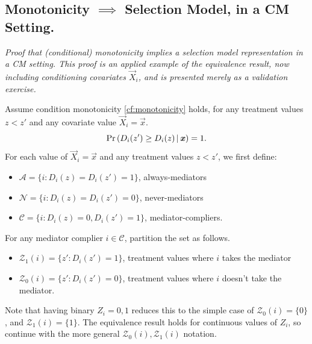 
\subsection{Monotonicity $\implies$ Selection Model, in a CM Setting.}
\label{appendix:cf-monotonicity}
\textit{Proof that (conditional) monotonicity implies a selection model representation in a CM setting.
    This proof is an applied example of the \cite{vytlacil2002independence} equivalence result, now including conditioning covariates $\vec X_i$, and is presented merely as a validation exercise.
}

Assume condition monotonicity \ref{cf:monotonicity} holds, for any treatment values $z < z'$ and any covariate value $\vec X_i = \vec x$.
\[ \Pr\left( D_i(z') \geq D_i(z) \, \middle\vert \, \boldsymbol{\mathit{x}} \right) = 1. \]
For each value of $\vec{X}_i = \vec{x}$ and any treatment values $z < z'$, we first define:
\begin{itemize}
    \item $\mathcal{A} = \{i : D_i(z) = D_i(z') = 1\}$, always-mediators
    \item $\mathcal{N} = \{i : D_i(z) = D_i(z') = 0\}$, never-mediators
    \item $\mathcal{C} = \{i : D_i(z) = 0, D_i(z') = 1\}$, mediator-compliers.
\end{itemize}
For any mediator complier $i \in \mathcal C$, partition the set as follows.
\begin{itemize}
    \item $\mathcal{Z}_1(i) = \{z' : D_i(z') = 1\}$, treatment values where $i$ takes the mediator
    \item $\mathcal{Z}_0(i) = \{z' : D_i(z') = 0\}$, treatment values where $i$ doesn't take the mediator.
\end{itemize}
Note that having binary $Z_i = 0,1$ reduces this to the simple case of $\mathcal{Z}_0(i) = \{0\}$, and $\mathcal{Z}_1(i) = \{1\}$.
The equivalence result holds for continuous values of $Z_i$, so continue with the more general $\mathcal{Z}_0(i), \mathcal{Z}_1(i)$ notation.

